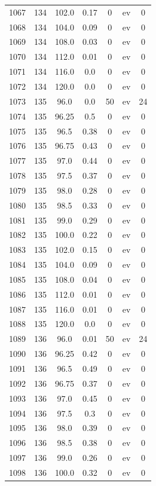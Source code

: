 \documentclass[12pt,a4paper]{article}
\begin{document}
\begin{tabular}{r|cccccc}
	1067 & 134 & 102.0 & 0.17 & 0 & ev & 0 \\
	1068 & 134 & 104.0 & 0.09 & 0 & ev & 0 \\
	1069 & 134 & 108.0 & 0.03 & 0 & ev & 0 \\
	1070 & 134 & 112.0 & 0.01 & 0 & ev & 0 \\
	1071 & 134 & 116.0 & 0.0 & 0 & ev & 0 \\
	1072 & 134 & 120.0 & 0.0 & 0 & ev & 0 \\
	1073 & 135 & 96.0 & 0.0 & 50 & ev & 24 \\
	1074 & 135 & 96.25 & 0.5 & 0 & ev & 0 \\
	1075 & 135 & 96.5 & 0.38 & 0 & ev & 0 \\
	1076 & 135 & 96.75 & 0.43 & 0 & ev & 0 \\
	1077 & 135 & 97.0 & 0.44 & 0 & ev & 0 \\
	1078 & 135 & 97.5 & 0.37 & 0 & ev & 0 \\
	1079 & 135 & 98.0 & 0.28 & 0 & ev & 0 \\
	1080 & 135 & 98.5 & 0.33 & 0 & ev & 0 \\
	1081 & 135 & 99.0 & 0.29 & 0 & ev & 0 \\
	1082 & 135 & 100.0 & 0.22 & 0 & ev & 0 \\
	1083 & 135 & 102.0 & 0.15 & 0 & ev & 0 \\
	1084 & 135 & 104.0 & 0.09 & 0 & ev & 0 \\
	1085 & 135 & 108.0 & 0.04 & 0 & ev & 0 \\
	1086 & 135 & 112.0 & 0.01 & 0 & ev & 0 \\
	1087 & 135 & 116.0 & 0.01 & 0 & ev & 0 \\
	1088 & 135 & 120.0 & 0.0 & 0 & ev & 0 \\
	1089 & 136 & 96.0 & 0.01 & 50 & ev & 24 \\
	1090 & 136 & 96.25 & 0.42 & 0 & ev & 0 \\
	1091 & 136 & 96.5 & 0.49 & 0 & ev & 0 \\
	1092 & 136 & 96.75 & 0.37 & 0 & ev & 0 \\
	1093 & 136 & 97.0 & 0.45 & 0 & ev & 0 \\
	1094 & 136 & 97.5 & 0.3 & 0 & ev & 0 \\
	1095 & 136 & 98.0 & 0.39 & 0 & ev & 0 \\
	1096 & 136 & 98.5 & 0.38 & 0 & ev & 0 \\
	1097 & 136 & 99.0 & 0.26 & 0 & ev & 0 \\
	1098 & 136 & 100.0 & 0.32 & 0 & ev & 0 \\

\end{tabular}
\end{document}
